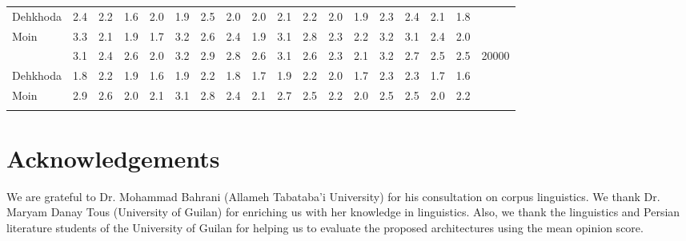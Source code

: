 \documentclass{article}
\begin{document}
\begin{table}[p]
{\begin{tabular}{l|c|c|c|c|c|c|c|c|c|c|c|c|c|c|c|c|c|}
			\multicolumn{1}{|l|}{Dehkhoda}         & 2.4 & 2.2  & 1.6  & 2.0  & 1.9 & 2.5  & 2.0  & 2.0  & 2.1   & 2.2   & 2.0   & 1.9   & 2.3   & 2.4    & 2.1    & 1.8   &                                  \\ \cline{1-17}
			\multicolumn{1}{|l|}{Moin}             & 3.3 & 2.1  & 1.9  & 1.7  & 3.2 & 2.6  & 2.4  & 1.9  & 3.1   & 2.8   & 2.3   & 2.2   & 3.2   & 3.1    & 2.4    & 2.0   &                                  \\ \hlineB{4}
			\multicolumn{1}{|l|}{Amid}             & 3.1 & 2.4  & 2.6  & 2.0  & 3.2 & 2.9  & 2.8  & 2.6  & 3.1   & 2.6   & 2.3   & 2.1   & 3.2   & 2.7    & 2.5    & 2.5 & \multirow{3}{*}{20000}           \\ \cline{1-17}
			\multicolumn{1}{|l|}{Dehkhoda}         & 1.8 & 2.2  & 1.9  & 1.6  & 1.9 & 2.2  & 1.8  & 1.7  & 1.9   & 2.2   & 2.0   & 1.7   & 2.3   & 2.3    & 1.7    & 1.6   &                                  \\ \cline{1-17}
			\multicolumn{1}{|l|}{Moin}             & 2.9 & 2.6  & 2.0  & 2.1  & 3.1 & 2.8  & 2.4  & 2.1  & 2.7   & 2.5   & 2.2   & 2.0   & 2.5   & 2.5    & 2.0    & 2.2   &                                  
			\\ \hlineB{}
		\end{tabular}
	}
	\label{tab:mos-eval}
\end{table}
\section{Acknowledgements}
We are grateful to Dr. Mohammad Bahrani (Allameh Tabataba'i University) for his consultation on corpus linguistics.
We thank Dr. Maryam Danay Tous (University of Guilan) for enriching us with her knowledge in linguistics. Also, we thank the linguistics and Persian literature students of the University of Guilan for helping us to evaluate the proposed architectures using the mean opinion score.
  
%
\end{document}
